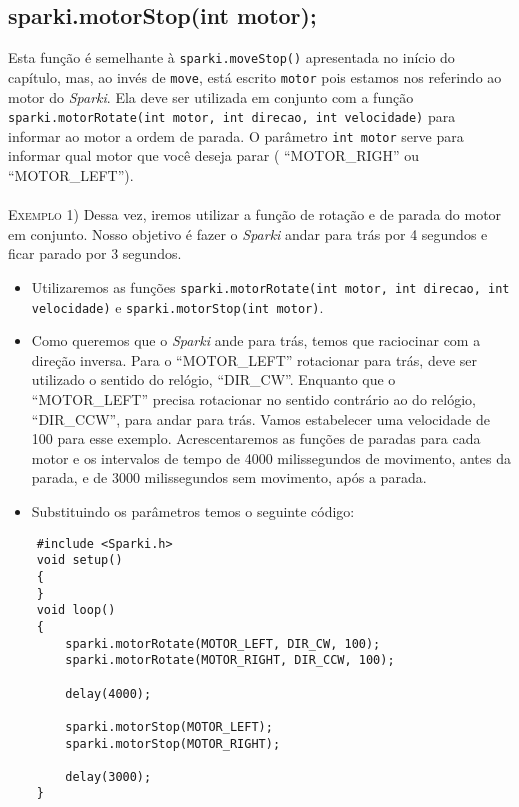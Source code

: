 \subsection{sparki.motorStop(int motor);}
Esta função é semelhante à \texttt{sparki.moveStop()} apresentada no início do capítulo, mas, ao invés de \texttt{move}, está escrito \texttt{motor} pois estamos nos referindo ao motor do \textsl{Sparki}. Ela deve ser utilizada em conjunto com a função \texttt{sparki.motorRotate(int motor, int direcao, int velocidade)} para informar ao motor a ordem de parada. O parâmetro \texttt{int motor} serve para informar qual motor que você deseja parar ( ``MOTOR\_RIGH'' ou ``MOTOR\_LEFT'').
\\
\\
\textsc{Exemplo 1)} Dessa vez, iremos utilizar a função de rotação e de parada do motor em conjunto. Nosso objetivo é fazer o \textsl{Sparki} andar para trás por 4 segundos e ficar parado por 3 segundos.
        
\begin{itemize}
    \item Utilizaremos as funções \texttt{sparki.motorRotate(int motor, int direcao, int velocidade)} e \texttt{sparki.motorStop(int motor)}.
    \item Como queremos que o \textsl{Sparki} ande para trás, temos que raciocinar com a direção inversa. Para o ``MOTOR\_LEFT'' rotacionar para trás, deve ser utilizado o sentido do relógio, ``DIR\_CW''. Enquanto que o ``MOTOR\_LEFT'' precisa rotacionar no sentido contrário ao do relógio, ``DIR\_CCW'', para andar para trás. Vamos estabelecer uma velocidade de 100 para esse exemplo. Acrescentaremos as funções de paradas para cada motor e os intervalos de tempo de 4000 milissegundos de movimento, antes da parada, e de 3000 milissegundos sem movimento, após a parada.
    \item Substituindo os parâmetros temos o seguinte código:
\end{itemize}
    
\begin{verbatim}
    #include <Sparki.h>
    void setup()
    {
    }
    void loop()
    {
        sparki.motorRotate(MOTOR_LEFT, DIR_CW, 100);
        sparki.motorRotate(MOTOR_RIGHT, DIR_CCW, 100);
        
        delay(4000);
        
        sparki.motorStop(MOTOR_LEFT);
        sparki.motorStop(MOTOR_RIGHT);
        
        delay(3000);
    }
\end{verbatim}


